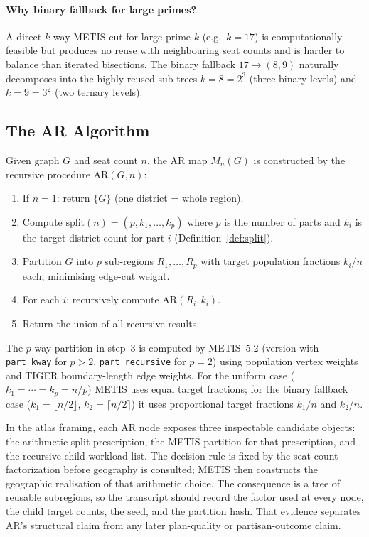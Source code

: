 \paragraph{Why binary fallback for large primes?} A direct $k$-way METIS
cut for large prime $k$ (e.g.\ $k=17$) is computationally feasible but
produces no reuse with neighbouring seat counts and is harder to balance than
iterated bisections. The binary fallback $17 \to (8, 9)$ naturally decomposes
into the highly-reused sub-trees $k=8=2^3$ (three binary levels) and $k=9=3^2$
(two ternary levels).

\subsection{The AR Algorithm}
\label{sec:pfr}

\begin{definition}[ApportionRegions]
  Given graph $G$ and seat count $n$, the AR map $M_n(G)$ is constructed by
  the recursive procedure $\text{AR}(G, n)$:
  \begin{enumerate}
    \item If $n = 1$: return $\{G\}$ (one district = whole region).
    \item Compute $\text{split}(n) = (p, k_1, \ldots, k_p)$ where $p$ is the
          number of parts and $k_i$ is the target district count for part $i$
          (Definition~\ref{def:split}).
    \item Partition $G$ into $p$ sub-regions $R_1, \ldots, R_p$ with target
          population fractions $k_i / n$ each, minimising edge-cut weight.
    \item For each $i$: recursively compute $\text{AR}(R_i, k_i)$.
    \item Return the union of all recursive results.
  \end{enumerate}
\end{definition}

The $p$-way partition in step~3 is computed by METIS~5.2 (version with
\texttt{part\_kway} for $p > 2$, \texttt{part\_recursive} for $p = 2$) using
population vertex weights and TIGER boundary-length edge weights. For the
uniform case ($k_1 = \cdots = k_p = n/p$) METIS uses equal target fractions;
for the binary fallback case ($k_1 = \lfloor n/2 \rfloor$, $k_2 = \lceil n/2
\rceil$) it uses proportional target fractions $k_1/n$ and $k_2/n$.

In the atlas framing, each AR node exposes three inspectable candidate
objects: the arithmetic split prescription, the METIS partition for that
prescription, and the recursive child workload list.
The decision rule is fixed by the seat-count factorization before geography is
consulted; METIS then constructs the geographic realisation of that arithmetic
choice.
The consequence is a tree of reusable subregions, so the transcript should
record the factor used at every node, the child target counts, the seed, and
the partition hash.
That evidence separates AR's structural claim from any later plan-quality or
partisan-outcome claim.

